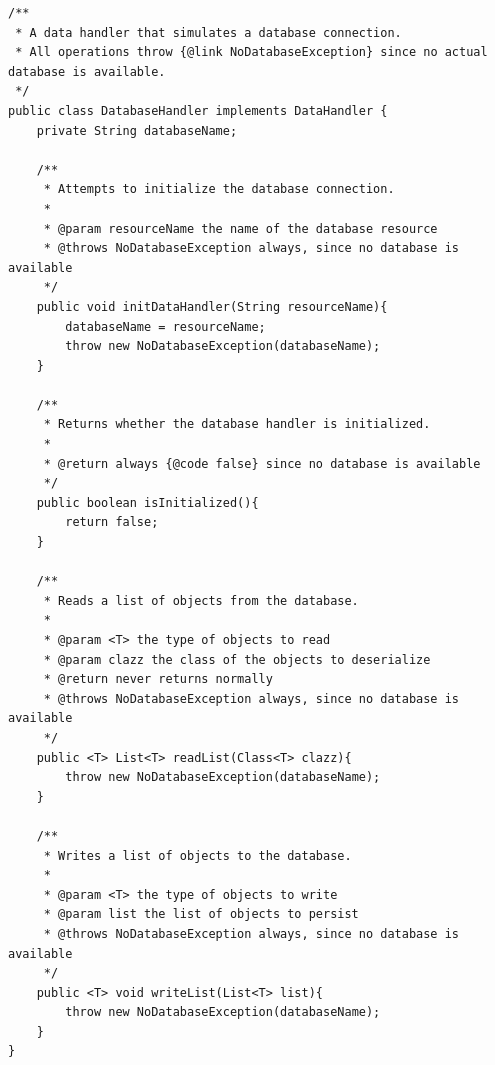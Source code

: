 \documentclass[a4paper]{scrartcl}
\begin{document}
\begin{lstlisting}[style=javastyle, caption={DatabaseHandler that implements DataHandler interface}]
/**
 * A data handler that simulates a database connection.
 * All operations throw {@link NoDatabaseException} since no actual database is available.
 */
public class DatabaseHandler implements DataHandler {
    private String databaseName;

    /**
     * Attempts to initialize the database connection.
     *
     * @param resourceName the name of the database resource
     * @throws NoDatabaseException always, since no database is available
     */
    public void initDataHandler(String resourceName){
        databaseName = resourceName;
        throw new NoDatabaseException(databaseName);
    }

    /**
     * Returns whether the database handler is initialized.
     *
     * @return always {@code false} since no database is available
     */
    public boolean isInitialized(){
        return false;
    }

    /**
     * Reads a list of objects from the database.
     *
     * @param <T> the type of objects to read
     * @param clazz the class of the objects to deserialize
     * @return never returns normally
     * @throws NoDatabaseException always, since no database is available
     */
    public <T> List<T> readList(Class<T> clazz){
        throw new NoDatabaseException(databaseName);
    }

    /**
     * Writes a list of objects to the database.
     *
     * @param <T> the type of objects to write
     * @param list the list of objects to persist
     * @throws NoDatabaseException always, since no database is available
     */
    public <T> void writeList(List<T> list){
        throw new NoDatabaseException(databaseName);
    }
}
\end{lstlisting}
\end{document}
